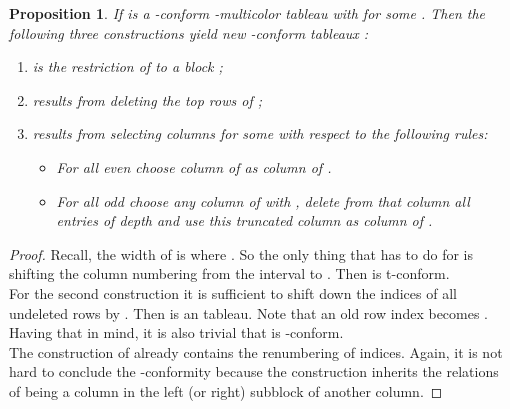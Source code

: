 \documentclass[a4paper,USenglish,numberwithinsect]{lipics}
\theoremstyle{plain}
\newtheorem{proposition}[theorem]{Proposition}
\begin{document}
\begin{proposition} \label{TabConstr}
If 
is a -conform  -multicolor tableau with  for some . Then the following three constructions
yield new   -conform tableaux   :
\begin{enumerate}
\item  is the restriction of  to a block
;
\item   results from  deleting  the top  rows
of  ;
\item  results from  selecting   columns
for some 
with respect to the following rules:
\begin{itemize}
\item For all even  choose column 
of  as
column  of .
\item For all odd  choose any column     of
 with
, delete from that
column all entries
of depth  and use this truncated column as column  of
.
\end{itemize}
\end{enumerate}
\end{proposition}
\begin{proof}
Recall, the width of  is   where  
.
So the only thing that has to do  for  is  shifting  the column
numbering
from the interval  to
. Then   is t-conform.
\\
For the second construction it is sufficient to shift down the indices
of all undeleted
rows by . Then  is an  tableau. Note
that an old row index
 becomes . Having that in mind, it
is also trivial
that   is -conform.
\\
The construction of  already contains the renumbering of
indices.  Again, it
is not hard to conclude the -conformity because the construction
inherits the relations
of being a column in the left (or right) subblock of another column.
\end{proof}
\end{document}
